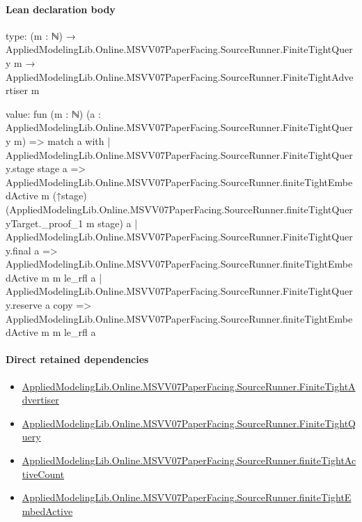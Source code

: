 \documentclass[10pt]{article}
\begin{document}
\paragraph{Lean declaration body}
\begin{ReviewVerbatim}
type:
(m : ℕ) →
  AppliedModelingLib.Online.MSVV07PaperFacing.SourceRunner.FiniteTightQuery m →
    AppliedModelingLib.Online.MSVV07PaperFacing.SourceRunner.FiniteTightAdvertiser m

value:
fun (m : ℕ) (a : AppliedModelingLib.Online.MSVV07PaperFacing.SourceRunner.FiniteTightQuery m) =>
  match a with
  | AppliedModelingLib.Online.MSVV07PaperFacing.SourceRunner.FiniteTightQuery.stage stage a =>
    AppliedModelingLib.Online.MSVV07PaperFacing.SourceRunner.finiteTightEmbedActive m (↑stage)
      (AppliedModelingLib.Online.MSVV07PaperFacing.SourceRunner.finiteTightQueryTarget._proof_1 m stage) a
  | AppliedModelingLib.Online.MSVV07PaperFacing.SourceRunner.FiniteTightQuery.final a =>
    AppliedModelingLib.Online.MSVV07PaperFacing.SourceRunner.finiteTightEmbedActive m m le_rfl a
  | AppliedModelingLib.Online.MSVV07PaperFacing.SourceRunner.FiniteTightQuery.reserve a copy =>
    AppliedModelingLib.Online.MSVV07PaperFacing.SourceRunner.finiteTightEmbedActive m m le_rfl a
\end{ReviewVerbatim}

\paragraph{Direct retained dependencies}
\begin{itemize}\raggedright
\item \hyperlink{governing-declaration-48ee018f3cdad0d9}{Applied\allowbreak{}Modeling\allowbreak{}Lib.\allowbreak{}Online.\allowbreak{}MSVV07\allowbreak{}Paper\allowbreak{}Facing.\allowbreak{}Source\allowbreak{}Runner.\allowbreak{}Finite\allowbreak{}Tight\allowbreak{}Advertiser}
\item \hyperlink{governing-declaration-feae64ffc2ccaca7}{Applied\allowbreak{}Modeling\allowbreak{}Lib.\allowbreak{}Online.\allowbreak{}MSVV07\allowbreak{}Paper\allowbreak{}Facing.\allowbreak{}Source\allowbreak{}Runner.\allowbreak{}Finite\allowbreak{}Tight\allowbreak{}Query}
\item \hyperlink{governing-declaration-a821db3d53d0e450}{Applied\allowbreak{}Modeling\allowbreak{}Lib.\allowbreak{}Online.\allowbreak{}MSVV07\allowbreak{}Paper\allowbreak{}Facing.\allowbreak{}Source\allowbreak{}Runner.\allowbreak{}finite\allowbreak{}Tight\allowbreak{}Active\allowbreak{}Count}
\item \hyperlink{governing-declaration-9112aa03d43a6903}{Applied\allowbreak{}Modeling\allowbreak{}Lib.\allowbreak{}Online.\allowbreak{}MSVV07\allowbreak{}Paper\allowbreak{}Facing.\allowbreak{}Source\allowbreak{}Runner.\allowbreak{}finite\allowbreak{}Tight\allowbreak{}Embed\allowbreak{}Active}
\end{itemize}
\hypertarget{governing-declaration-559e2180da85fef0}{}
\end{document}
